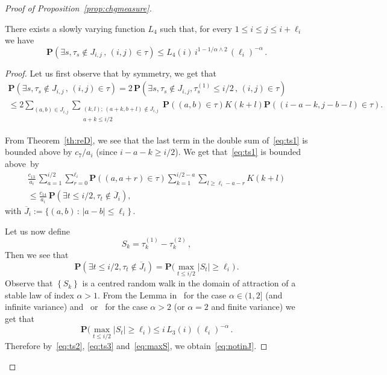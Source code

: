 \documentclass[AHL,Unicode,longabstracts]{cedram}
\newcommand{\ga}{\alpha}
\newcommand{\bP}{\ensuremath{\mathbf{P}}}
\newcommand{\sumtwo}[2]{\sum_{\substack{#1 \\ #2}}}
\let\oldexists\exists
\renewcommand*{\exists}{\mathrel{\oldexists}}
\begin{document}
\begin{proof}[Proof of Proposition~\ref{prop:chgmeasure}]
\begin{lemm}\label{lem:notinJ}
There exists a slowly varying function $L_{4}$ such that, for every $1\leq i\leq j\leq i+\ell_i$ we have
\begin{equation}\label{eq:notinJ}
\bP\left(\exists s, \tau_s \notin J_{i,j}\,,\,(i,j)\in\tau\right) \leq L_{4}(i)\,i^{1-1/\ga \wedge 2}\,(\ell_i)^{- \ga}\,.
\end{equation}
\end{lemm}

\begin{proof}
Let us first observe that by symmetry, we get that
\begin{multline}\label{eq:ts1}
\bP\left(\exists s, \tau_s \notin J_{i,j}\,,\,(i,j)\in\tau\right) = 2\,\bP\left(\exists s, \tau_s \notin J_{i,j}, \tau_s^{(1)}\leq i/2\,,\,(i,j)\in\tau \right)
\\
\leq 2 \sum_{(a,b) \in J_{i,j}} \sumtwo{(k,l);\,(a+k,b+l) \notin J_{i,j}}{a+k\leq i/2} \bP((a,b) \in \tau) K(k+l) \bP \left((i-a-k, j-b-l) \in \tau \right).
\end{multline}

From Theorem~\ref{th:reD}, we see that the last term in the double sum of~\eqref{eq:ts1} is bounded above by $c_7/a_i$ (since $i-a-k \geq i/2$). We get that~\eqref{eq:ts1} is bounded above~by
\begin{multline}\label{eq:ts2}
\frac{c_{13}}{a_i}\,\sum_{a=1}^{i/2} \sum_{r=0}^{\ell_i} \bP \left((a,a+r) \in \tau \right) \sum_{k = 1}^{i/2 - a}
\sum_{l \ge \ell_i - a-r} K(k+l)\\ 
\le \frac{c_{14}}{a_i}\,\bP\left(\exists t \le i/2, \tau_t \notin \overline{J}_{i} \right),
\end{multline}
with $\overline{J}_{i} := \big\{(a,b)\,:\,|a-b| \leq \ell_i \big\}\,.$

Let us now define
\begin{equation}
S_k = \tau_k^{(1)} - \tau_k^{(2)}\,,
\end{equation}
Then we see that
\begin{equation}\label{eq:ts3}
\bP\left(\exists t \le i/2, \tau_t \notin \overline{J}_{i} \right) =
\bP \Big(\max_{t \le i/2} \vert S_t \vert \ge \ell_i \Big)\,.
\end{equation}
Observe that $\left\lbrace S_k \right\rbrace$ is a centred random walk in the domain of attraction of a stable law of index $\ga >1$. From the Lemma in~\cite{cf:SW11} for the case $\ga \in (1,2]$ (and infinite variance) and~\cite[Corollary~1]{cf:Pi81} or~\cite[Equation (12)]{cf:BB00} for the case $\ga >2$ (or $\ga=2$ and finite variance) we get that
\begin{equation}\label{eq:maxS}
\bP \Big(\max_{t \le i/2} \vert S_t \vert \ge \ell_i \Big) \le i\,L_{3}(i)\,(\ell_i)^{- \ga}\,.
\end{equation}
Therefore by~\eqref{eq:ts2}, \eqref{eq:ts3} and~\eqref{eq:maxS}, we obtain~\eqref{eq:notinJ}.
\end{proof}


\end{proof}
\end{document}
